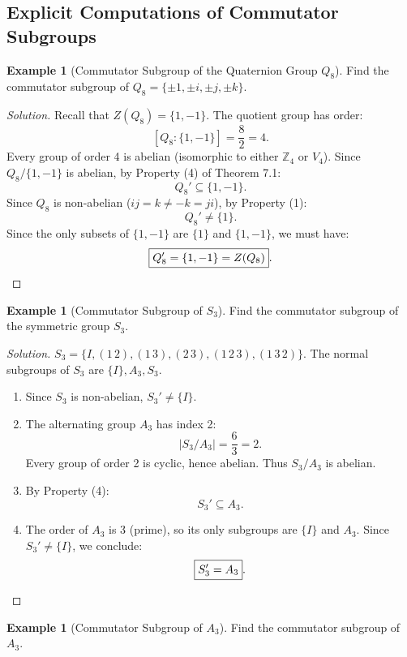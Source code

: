 \documentclass[12pt]{article}
\theoremstyle{definition}
\newtheorem{example}[definition]{Example}
\theoremstyle{plain}
\begin{document}
\subsection{Explicit Computations of Commutator Subgroups}

\begin{example}[Commutator Subgroup of the Quaternion Group $Q_8$]
Find the commutator subgroup of $Q_8 = \{ \pm 1, \pm i, \pm j, \pm k \}$.
\end{example}

\begin{proof}[Solution]
Recall that $Z(Q_8) = \{ 1, -1 \}$.
The quotient group has order:
\[
[Q_8 : \{1, -1\}] = \frac{8}{2} = 4.
\]
Every group of order 4 is abelian (isomorphic to either $\mathbb{Z}_4$ or $V_4$).
Since $Q_8/\{1, -1\}$ is abelian, by Property (4) of Theorem 7.1:
\[
Q_8' \subseteq \{ 1, -1 \}.
\]
Since $Q_8$ is non-abelian ($i j = k \neq -k = j i$), by Property (1):
\[
Q_8' \neq \{ 1 \}.
\]
Since the only subsets of $\{1, -1\}$ are $\{1\}$ and $\{1, -1\}$, we must have:
\[
\boxed{Q_8' = \{ 1, -1 \} = Z(Q_8)}. \qedhere
\]
\end{proof}

\begin{example}[Commutator Subgroup of $S_3$]
Find the commutator subgroup of the symmetric group $S_3$.
\end{example}

\begin{proof}[Solution]
$S_3 = \{ I, (1\,2), (1\,3), (2\,3), (1\,2\,3), (1\,3\,2) \}$.
The normal subgroups of $S_3$ are $\{I\}, A_3, S_3$.
\begin{enumerate}
    \item Since $S_3$ is non-abelian, $S_3' \neq \{I\}$.
    \item The alternating group $A_3$ has index 2:
    \[
    |S_3/A_3| = \frac{6}{3} = 2.
    \]
    Every group of order 2 is cyclic, hence abelian.
    Thus $S_3/A_3$ is abelian.
    \item By Property (4):
    \[
    S_3' \subseteq A_3.
    \]
    \item The order of $A_3$ is 3 (prime), so its only subgroups are $\{I\}$ and $A_3$.
    Since $S_3' \neq \{I\}$, we conclude:
    \[
    \boxed{S_3' = A_3}. \qedhere
    \]
\end{enumerate}
\end{proof}

\begin{example}[Commutator Subgroup of $A_3$]
Find the commutator subgroup of $A_3$.
\end{example}
\end{document}
